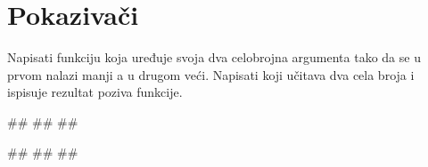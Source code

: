 
\section{Pokazivači}


\begin{Exercise}[label=v2.2_01] 
Napisati funkciju koja uređuje svoja dva celobrojna argumenta tako da se u prvom nalazi manji a u drugom veći. Napisati koji učitava dva cela broja i ispisuje rezultat poziva funkcije. \\
\begin{miditest}
\begin{upotreba}{1}
#\naslovInt#
##
##
\end{upotreba}
\end{miditest}
\begin{miditest}
\begin{upotreba}{2}
#\naslovInt#
##
##
\end{upotreba}
\end{miditest}

\end{Exercise}
\begin{Answer}[ref=v2.2_01]
\end{Answer}

